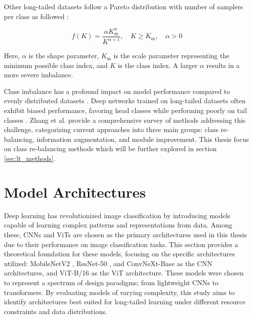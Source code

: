 Other long-tailed datasets follow a Pareto distribution with number of samplers per class as followed \cite{liu2019largescalelongtailedrecognitionopen}:

\begin{equation}
    \label{eq:pareto}
    f(K) = \frac{\alpha K_{\text{m}}^\alpha}{K^{\alpha + 1}}, \quad K \geq K_{\text{m}}, \quad \alpha > 0
\end{equation}

\noindent Here, $\alpha$ is the shape parameter, $K_{\text{m}}$ is the scale parameter representing the minimum possible class index, and $K$ is the class index. A larger $\alpha$ results in a more severe imbalance.



Class imbalance has a profound impact on model performance compared to evenly distributed datasets \cite{vanhorn2017deviltailsfinegrainedclassification, cui2019classbalancedlossbasedeffective}. Deep networks trained on long-tailed datasets often exhibit biased performance, favoring head classes while performing poorly on tail classes \cite{zhang2023deep}. Zhang et al. \cite{zhang2023deep} provide a comprehensive survey of methods addressing this challenge, categorizing current approaches into three main groups: class re-balancing, information augmentation, and module improvement. This thesis focus on class re-balancing methods which will be further explored in section \ref{sec:lt_methods}. 





\section{Model Architectures}
\label{sec:model_arch}
Deep learning has revolutionized image classification by introducing models capable of learning complex patterns and representations from data. Among these, CNNs and ViTs are chosen as the primary architectures used in this thesis due to their performance on image classification tasks. This section provides a theoretical foundation for these models, focusing on the specific architectures utilized: MobileNetV2 \cite{sandler2018mobilenetv2}, ResNet-50 \cite{he2015deepresiduallearningimage}, and ConvNeXt-Base \cite{todi2023convnext} as the CNN architectures, and ViT-B/16 \cite{dosovitskiy2021imageworth16x16words} as the ViT architecture.
These models were chosen to represent a spectrum of design paradigms; from lightweight CNNs to transformers. By evaluating models of varying complexity, this study aims to identify architectures best suited for long-tailed learning under different resource constraints and data distributions.

